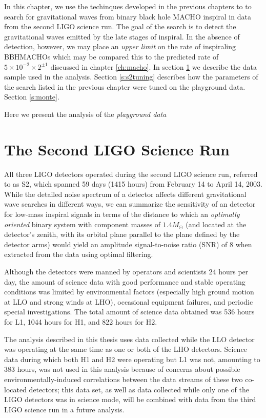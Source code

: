 
In this chapter, we use the techinques developed in the previous chapters to
to search for gravitational waves from binary black hole MACHO inspiral in
data from the second LIGO science run. The goal of the search is to detect the
gravitational waves emitted by the late stages of inspiral. In the absence of
detection, however, we may place an \emph{upper limit} on the rate of
inspiraling BBHMACHOs which may be compared this to the predicted rate of $5
\times 10^{-2} \times 2^{\pm 1}$ discussed in chapter \ref{ch:macho}. In
section \ref{s:s2run} we describe the data sample used in the analysis.
Section \ref{s:s2tuning} describes how the parameters of the search listed in
the previous chapter were tuned on the playground data. Section
\ref{s:monte}.



Here we present the analysis of the
\emph{playground data}



\section{The Second LIGO Science Run}
\label{s:s2run}

All three LIGO detectors operated during the second LIGO science run, referred
to as S2, which spanned 59 days (1415 hours) from February 14 to April 14,
2003. While the detailed noise spectrum of a detector affects different
gravitational wave searches in different ways, we can summarize the
sensitivity of an detector for low-mass inspiral signals in terms of the
distance to which an {\em optimally oriented} binary system with component
masses of $1.4 M_\odot$ (and located at the detector's zenith, with its
orbital plane parallel to the plane defined by the detector arms) would yield
an amplitude signal-to-noise ratio (SNR) of 8 when extracted from the data
using optimal filtering. 

Although the detectors were manned by operators and scientists 24 hours per
day, the amount of science data with good performance and stable operating
conditions was limited by environmental factors (especially high ground motion
at LLO and strong winds at LHO), occasional equipment failures, and periodic
special investigations.  The total amount of science data obtained was 536
hours for L1, 1044 hours for H1, and 822 hours for H2.

The analysis described in this thesis uses data collected while the LLO
detector was operating at the same time as one or both of the LHO detectors.
Science data during which both H1 and H2 were operating but L1 was not,
amounting to 383 hours, was not used in this analysis because of
concerns about possible environmentally-induced correlations between the data
streams of these two co-located detectors; this data set, as well as data
collected while only one of the LIGO detectors was in science mode, will be
combined with data from the third LIGO science run in a future analysis.

